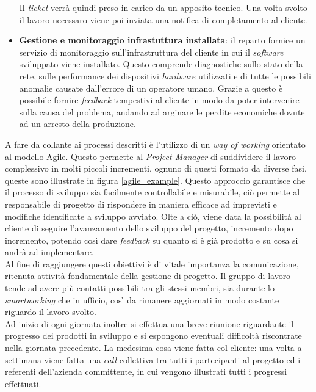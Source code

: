\begin{itemize}
    Il \emph{ticket} verrà quindi preso in carico da un apposito tecnico. Una volta svolto il lavoro necessaro viene poi inviata una notifica di completamento al cliente. 
    \item \textbf{Gestione e monitoraggio infrastuttura installata}: il reparto fornice un servizio di monitoraggio sull'infrastruttura del cliente in cui il
    \emph{software} sviluppato viene installato. Questo comprende diagnostiche sullo stato della rete, sulle performance dei dispositivi \emph{hardware}
    utilizzati e di tutte le possibili anomalie causate dall'errore di un operatore umano. Grazie a questo è possibile fornire \emph{feedback}
    tempestivi al cliente in modo da poter intervenire sulla causa del problema, andando ad arginare le perdite economiche dovute ad un arresto della produzione.
\end{itemize} 

A fare da collante ai processi descritti è l'utilizzo di un \emph{way of working} orientato al modello Agile. 
Questo permette al \emph{Project Manager} di suddividere il lavoro complessivo in molti piccoli incrementi, 
ognuno di questi formato da diverse fasi, queste sono illustrate in figura \ref{agile_example}. 
Questo approccio garantisce che il processo di sviluppo sia facilmente controllabile e misurabile, ciò permette al responsabile di progetto
di rispondere in maniera efficace ad imprevisti e modifiche identificate a sviluppo avviato. 
Olte a ciò, viene data la possibilità al cliente di seguire l'avanzamento dello sviluppo del progetto, incremento dopo incremento, potendo così 
dare \emph{feedback} su quanto si è già prodotto e su cosa si andrà ad implementare. \\
Al fine di raggiungere questi obiettivi è di vitale importanza la comunicazione, ritenuta attività fondamentale della
gestione di progetto. Il gruppo di lavoro tende ad avere più contatti possibili tra gli stessi membri, 
sia durante lo \emph{smartworking} che in ufficio, così da rimanere aggiornati in modo costante riguardo il lavoro svolto. \\
Ad inizio di ogni giornata inoltre si effettua una breve riunione riguardante il progresso dei prodotti in sviluppo 
e si espongono eventuali difficoltà riscontrate nella giornata precedente.
La medesima cosa viene fatta col cliente: una volta a settimana viene fatta una \emph{call} collettiva tra tutti i partecipanti al
progetto ed i referenti dell'azienda committente, in cui vengono illustrati tutti i progressi effettuati.

